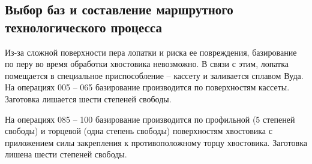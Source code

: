 \subsection{Выбор баз и составление маршрутного технологического процесса}

Из-за сложной поверхности пера лопатки и риска ее повреждения, базирование по перу во время обработки хвостовика невозможно. В связи с этим, лопатка помещается в специальное приспособление – кассету и заливается сплавом Вуда. На операциях 005 – 065 базирование производится по поверхностям кассеты. Заготовка лишается шести степеней свободы.

На операциях 085 – 100 базирование производится по профильной (5 степеней свободы) и торцевой (одна степень свободы) поверхностям хвостовика с приложением силы закрепления к противоположному торцу хвостовика. Заготовка лишена шести степеней свободы.
